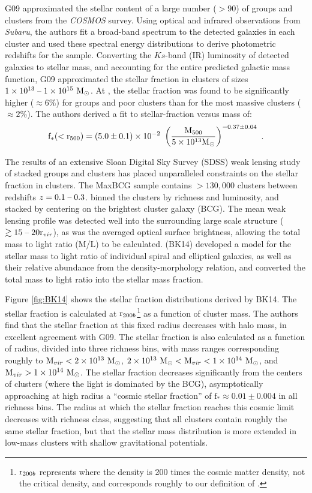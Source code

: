 G09 approximated the stellar content of a large number ($>90$) of
groups and clusters from the \textit{COSMOS} survey. Using optical and infrared
observations from \textit{Subaru}, the authors fit a broad-band spectrum to the
detected galaxies in each cluster and used these spectral energy
distributions to derive photometric redshifts for the
sample. Converting the $Ks$-band (IR) luminosity of detected galaxies
to stellar mass, and accounting for the entire predicted galactic mass
function, G09 approximated the stellar fraction in clusters of sizes
$1\times 10^{13}\;\textrm{--}\;1\times 10^{15}~\textrm{M}_\odot$. At \rfive{}, the stellar
fraction was found to be significantly higher ($\approx 6\%$) for
groups and poor clusters than for the most massive clusters ($\approx
2\%$). The authors derived a fit to stellar-fraction versus mass of:
\begin{equation}
\textrm{f}_{*}(<\textrm{r\ensuremath{_{500}}}{}) =
(5.0\pm0.1)\times 10^{-2}~\left(\frac{\textrm{M\ensuremath{_{500}}}}{5\times 10^{13}\textrm{M}_\odot}\right)^{-0.37\pm0.04}~. \nonumber
\end{equation}

The results of an extensive Sloan Digital Sky Survey (SDSS) weak
lensing study of stacked groups and clusters has placed unparalleled
constraints on the stellar fraction in clusters. The MaxBCG sample
\citep{Sheldon2009a} contains $> 130,000$ clusters between redshifts
$z = 0.1\;\textrm{--}\;0.3$. \citet{Sheldon2009b} binned the clusters by
richness and luminosity, and stacked by centering on the brightest
cluster galaxy (BCG). The mean weak lensing profile was detected well
into the surrounding large scale structure ($\gtrsim 15\;\textrm{--}\;20 \textrm{r\ensuremath{_{vir}}}$),
as was the averaged optical surface brightness, allowing the total
mass to light ratio (M/L) to be
calculated. \textbf{\citet{Bahcall2014}} (BK14) developed a model for
the stellar mass to light ratio of individual spiral and elliptical
galaxies, as well as their relative abundance from the
density-morphology relation, and converted the total mass to light
ratio into the stellar mass fraction.

Figure \ref{fig:BK14} shows the stellar fraction distributions derived
by BK14.  The stellar fraction is calculated at
$\textrm{r}{}_{200b}$\footnote{$\textrm{r}{}_{200b}$ represents where the
  density is 200 times the cosmic matter density, not the critical
  density, and corresponds roughly to our definition of \rvir{}.} as a
function of cluster mass. The authors find that the stellar fraction
at this fixed radius decreases with halo mass, in excellent agreement
with G09. The stellar fraction is also calculated as a function of
radius, divided into three richness bins, with mass ranges
corresponding roughly to $\textrm{M\ensuremath{_{vir}}}{}< 2\times 10^{13}~\textrm{M}_\odot$,
$2\times 10^{13}~\textrm{M}_\odot{} < \textrm{M\ensuremath{_{vir}}}{} < 1\times 10^{14}~\textrm{M}_\odot{}$, and
$\textrm{M\ensuremath{_{vir}}}{}>1\times 10^{14}~\textrm{M}_\odot{}$. The stellar fraction decreases
significantly from the centers of clusters (where the light is
dominated by the BCG), asymptotically approaching at high radius a
``cosmic stellar fraction'' of $\textrm{f}_{*} \approx 0.01 \pm 0.004$
in all richness bins. The radius at which the stellar fraction reaches
this cosmic limit decreases with richness class, suggesting that all
clusters contain roughly the same stellar fraction, but that the
stellar mass distribution is more extended in low-mass clusters with
shallow gravitational potentials.

